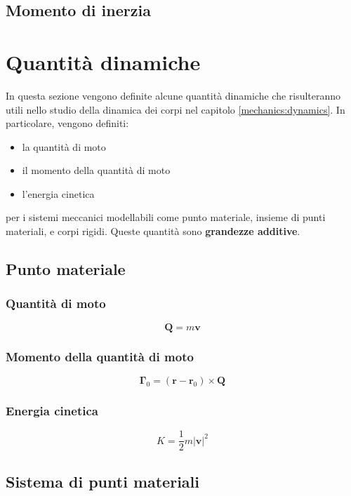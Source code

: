 \subsection{Momento di inerzia}

\section{Quantità dinamiche}
In questa sezione vengono definite alcune quantità dinamiche che risulteranno utili nello studio della dinamica dei corpi nel capitolo \ref{mechanics:dynamics}. In particolare, vengono definiti:
\begin{itemize}
  \item la quantità di moto
  \item il momento della quantità di moto
  \item l'energia cinetica
\end{itemize}
per i sistemi meccanici modellabili come punto materiale, insieme di punti materiali, e corpi rigidi.
Queste quantità sono \textbf{grandezze additive}.

\subsection{Punto materiale}
\subsubsection{Quantità di moto}
\begin{equation}
  \mathbf{Q} = m \mathbf{v}
\end{equation}
\subsubsection{Momento della quantità di moto}
\begin{equation}
    \mathbf{\Gamma}_0 = \left(\mathbf{r} - \mathbf{r}_0 \right) \times \mathbf{Q}
\end{equation}
\subsubsection{Energia cinetica}
\begin{equation}
    K = \dfrac{1}{2} m | \mathbf{v} |^2
\end{equation}

\subsection{Sistema di punti materiali}
